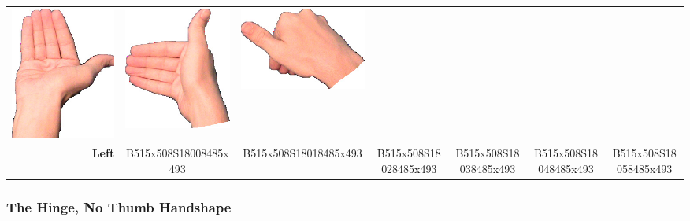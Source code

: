 \documentclass{article}
\begin{document}
\begin{center}
\begin{tabular}{r*{6}{c}}
\includegraphics[scale=0.1]{images/05-19-4.jpg}&
\includegraphics[scale=0.1]{images/05-19-5.jpg}&
\includegraphics[scale=0.1]{images/05-19-6.jpg}\\
\textbf{Left}&
B515x508S18008485x493&
B515x508S18018485x493&
B515x508S18028485x493&
B515x508S18038485x493&
B515x508S18048485x493&
B515x508S18058485x493\\
\end{tabular}
\end{center}

\subsubsection{The Hinge, No Thumb Handshape}
\end{document}
